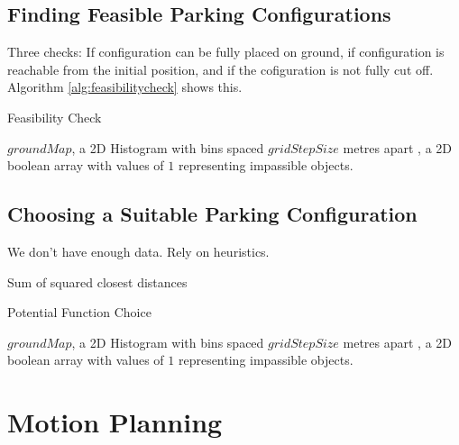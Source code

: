 \section{Finding Feasible Parking Configurations}
Three checks: If configuration can be fully placed on ground, if configuration
is reachable from the initial position, and if the cofiguration is not fully cut
off.
Algorithm \autoref{alg:feasibilitycheck} shows this.

\begin{algorithm}
\caption{Feasibility Check}
\label{alg:feasibilitycheck}
\begin{algorithmic}[1]
\Statex
{}
    \State $groundMap$, a 2D Histogram with bins spaced $gridStepSize$ metres apart
\EndFunction
\Statex
{}, a 2D boolean array with values of $1$ representing
impassible objects.
\end{algorithmic}
\end{algorithm}

\section{Choosing a Suitable Parking Configuration}
We don't have enough data.
Rely on heuristics.

Sum of squared closest distances


\begin{algorithm}
\caption{Potential Function Choice}
\label{alg:potentialfunctionchoice}
\begin{algorithmic}[1]
\Statex
{}
    \State $groundMap$, a 2D Histogram with bins spaced $gridStepSize$ metres apart
\EndFunction
\Statex
{}, a 2D boolean array with values of $1$ representing
impassible objects.
\end{algorithmic}
\end{algorithm}


\chapter{Motion Planning}
